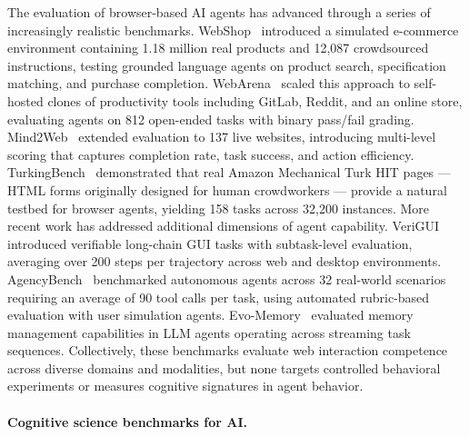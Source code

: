\documentclass{article}
\begin{document}
The evaluation of browser-based AI agents has advanced through a series of increasingly realistic benchmarks. WebShop~\citep{yao2022webshop} introduced a simulated e-commerce environment containing 1.18 million real products and 12,087 crowdsourced instructions, testing grounded language agents on product search, specification matching, and purchase completion. WebArena~\citep{zhou2024webarena} scaled this approach to self-hosted clones of productivity tools including GitLab, Reddit, and an online store, evaluating agents on 812 open-ended tasks with binary pass/fail grading. Mind2Web~\citep{deng2024mind2web} extended evaluation to 137 live websites, introducing multi-level scoring that captures completion rate, task success, and action efficiency. TurkingBench~\citep{xu2025turkingbench} demonstrated that real Amazon Mechanical Turk HIT pages --- HTML forms originally designed for human crowdworkers --- provide a natural testbed for browser agents, yielding 158 tasks across 32,200 instances. More recent work has addressed additional dimensions of agent capability. VeriGUI~\citep{liu2025verigui} introduced verifiable long-chain GUI tasks with subtask-level evaluation, averaging over 200 steps per trajectory across web and desktop environments. AgencyBench~\citep{li2026agencybench} benchmarked autonomous agents across 32 real-world scenarios requiring an average of 90 tool calls per task, using automated rubric-based evaluation with user simulation agents. Evo-Memory~\citep{wei2025evomemory} evaluated memory management capabilities in LLM agents operating across streaming task sequences. Collectively, these benchmarks evaluate web interaction competence across diverse domains and modalities, but none targets controlled behavioral experiments or measures cognitive signatures in agent behavior.

\paragraph{Cognitive science benchmarks for AI.}
\end{document}

